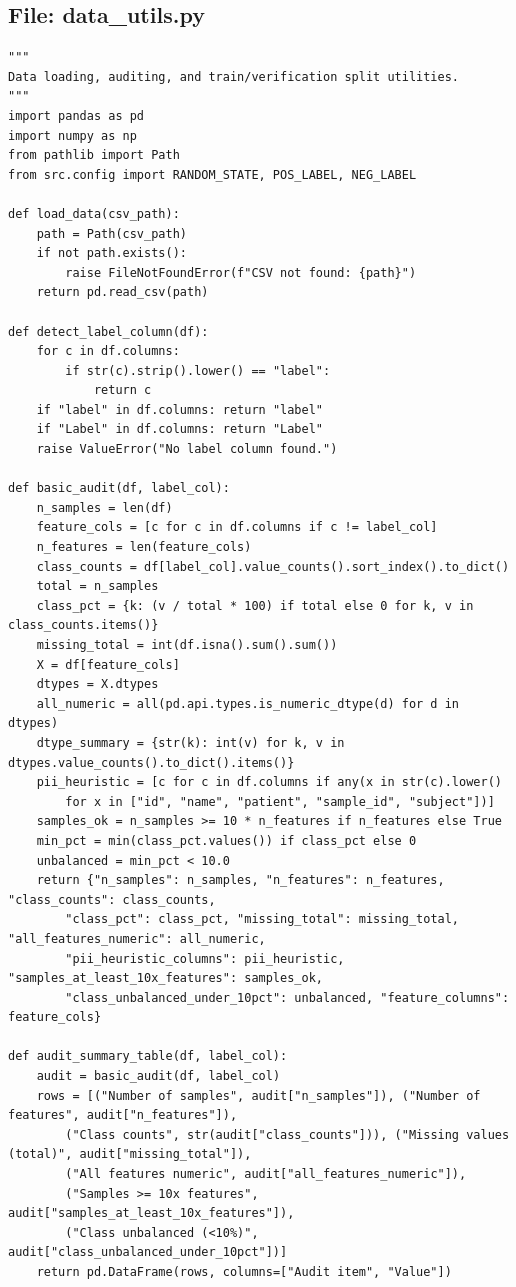 \documentclass[11pt]{article}
\begin{document}
\subsection*{File: data\_utils.py}

\begin{lstlisting}[style=pythonstyle]
"""
Data loading, auditing, and train/verification split utilities.
"""
import pandas as pd
import numpy as np
from pathlib import Path
from src.config import RANDOM_STATE, POS_LABEL, NEG_LABEL

def load_data(csv_path):
    path = Path(csv_path)
    if not path.exists():
        raise FileNotFoundError(f"CSV not found: {path}")
    return pd.read_csv(path)

def detect_label_column(df):
    for c in df.columns:
        if str(c).strip().lower() == "label":
            return c
    if "label" in df.columns: return "label"
    if "Label" in df.columns: return "Label"
    raise ValueError("No label column found.")

def basic_audit(df, label_col):
    n_samples = len(df)
    feature_cols = [c for c in df.columns if c != label_col]
    n_features = len(feature_cols)
    class_counts = df[label_col].value_counts().sort_index().to_dict()
    total = n_samples
    class_pct = {k: (v / total * 100) if total else 0 for k, v in class_counts.items()}
    missing_total = int(df.isna().sum().sum())
    X = df[feature_cols]
    dtypes = X.dtypes
    all_numeric = all(pd.api.types.is_numeric_dtype(d) for d in dtypes)
    dtype_summary = {str(k): int(v) for k, v in dtypes.value_counts().to_dict().items()}
    pii_heuristic = [c for c in df.columns if any(x in str(c).lower()
        for x in ["id", "name", "patient", "sample_id", "subject"])]
    samples_ok = n_samples >= 10 * n_features if n_features else True
    min_pct = min(class_pct.values()) if class_pct else 0
    unbalanced = min_pct < 10.0
    return {"n_samples": n_samples, "n_features": n_features, "class_counts": class_counts,
        "class_pct": class_pct, "missing_total": missing_total, "all_features_numeric": all_numeric,
        "pii_heuristic_columns": pii_heuristic, "samples_at_least_10x_features": samples_ok,
        "class_unbalanced_under_10pct": unbalanced, "feature_columns": feature_cols}

def audit_summary_table(df, label_col):
    audit = basic_audit(df, label_col)
    rows = [("Number of samples", audit["n_samples"]), ("Number of features", audit["n_features"]),
        ("Class counts", str(audit["class_counts"])), ("Missing values (total)", audit["missing_total"]),
        ("All features numeric", audit["all_features_numeric"]),
        ("Samples >= 10x features", audit["samples_at_least_10x_features"]),
        ("Class unbalanced (<10%)", audit["class_unbalanced_under_10pct"])]
    return pd.DataFrame(rows, columns=["Audit item", "Value"])


\end{lstlisting}
\end{document}
